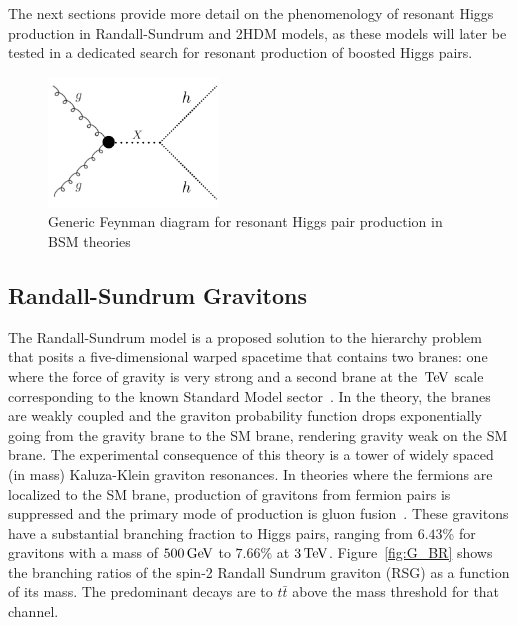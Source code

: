 %
The next sections provide more detail on the phenomenology of resonant Higgs production in Randall-Sundrum and 2HDM models, as these models will later be tested in a dedicated search for resonant production of boosted Higgs pairs. 
%
\begin{figure}[h!]
  \centering
  \captionsetup{justification=centering}

  \includegraphics[width=0.4\textwidth]{figures/Generic_res}
   \caption{Generic Feynman diagram for resonant Higgs pair production in BSM theories}
  \label{fig:HH_res}
\end{figure}
%

\subsection{Randall-Sundrum Gravitons}

The Randall-Sundrum model is a proposed solution to the hierarchy problem that posits a five-dimensional warped spacetime that contains two branes: one where the force of gravity is very strong and a second brane at the $\TeV$ scale corresponding to the known Standard Model sector~\cite{RSG1}. In the theory, the branes are weakly coupled and the graviton probability function drops exponentially going from the gravity brane to the SM brane, rendering gravity weak on the SM brane. The experimental consequence of this theory is a tower of widely spaced (in mass) Kaluza-Klein graviton resonances. In theories where the fermions are localized to the SM brane, production of gravitons from fermion pairs is suppressed and the primary mode of production is gluon fusion~\cite{RSG_LHC}. These gravitons have a substantial branching fraction to Higgs pairs, ranging from $6.43$\% for gravitons with a mass of $500 \GeV$ to $7.66\%$ at $3 \TeV$. Figure~\ref{fig:G_BR} shows the branching ratios of the spin-2 Randall Sundrum graviton (RSG) as a function of its mass. The predominant decays are to $t\bar{t}$ above the mass threshold for that channel. 

